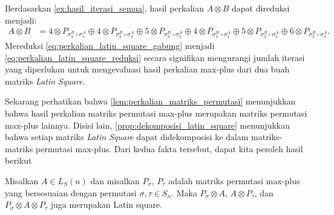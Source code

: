 \begin{contoh}
  Berdasarkan \autoref{ex:hasil_iterasi_semua}, hasil perkalian $A \otimes B$ dapat direduksi menjadi:
  \begin{align*}
    A \otimes B & = 4 \otimes P_{\sigma_3^B \circ \sigma_1^A} \oplus 4 \otimes P_{\sigma_2^B \circ \sigma_2^A} \oplus 5 \otimes P_{\sigma_3^B \circ \sigma_2^A} \oplus 4 \otimes P_{\sigma_1^B \circ \sigma_3^A} \oplus 5 \otimes P_{\sigma_2^B \circ \sigma_3^A} \oplus 6 \otimes P_{\sigma_3^B \circ \sigma_3^A}.
  \end{align*}
  Mereduksi \eqref{eq:perkalian_latin_square_gabung} menjadi \eqref{eq:perkalian_latin_square_reduksi} secara signifikan mengurangi jumlah iterasi yang diperlukan untuk mengevaluasi hasil perkalian max-plus dari dua buah matriks \emph{Latin Square}.
\end{contoh}

Sekarang perhatikan bahwa \autoref{lem:perkalian_matriks_permutasi} menunjukkan bahwa hasil perkalian matriks permutasi max-plus merupakan matriks permutasi max-plus lainnya. Disisi lain, \autoref{prop:dekomposisi_latin_square} menunjukkan bahwa setiap matriks \emph{Latin Square} dapat didekomposisi ke dalam matriks-matriks permutasi max-plus. Dari kedua fakta tersebut, dapat kita peroleh hasil berikut

\begin{teorema}\label{thm:perkalian_permutasi_menjaga_latin_square}
  Misalkan $A\in L_S(n)$ dan misalkan $P_\sigma$, $P_\tau$ adalah matriks
  permutasi max-plus yang bersesuaian dengan permutasi
  $\sigma,\tau\in S_n$. Maka
  $P_\sigma\otimes A$, $A\otimes P_\tau$, dan
  $P_\sigma\otimes A\otimes P_\tau$ juga merupakan Latin square.
\end{teorema}

